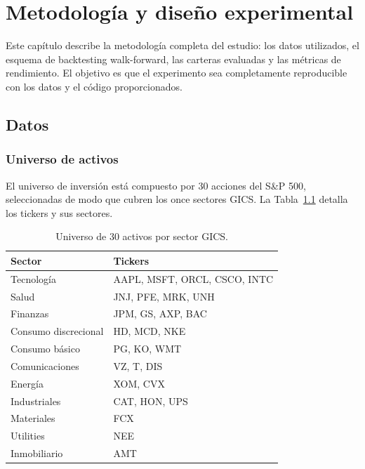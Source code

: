 \chapter{Metodología y diseño experimental}
\label{ch:metodologia}

Este capítulo describe la metodología completa del estudio: los datos
utilizados, el esquema de backtesting walk-forward, las carteras evaluadas
y las métricas de rendimiento. El objetivo es que el experimento sea
completamente reproducible con los datos y el código proporcionados.

\section{Datos}

\subsection{Universo de activos}

El universo de inversión está compuesto por 30 acciones del S\&P 500,
seleccionadas de modo que cubren los once sectores GICS. La
Tabla~\ref{tab:universo} detalla los tickers y sus sectores.

\begin{table}[htbp]
    \centering
    \caption{Universo de 30 activos por sector GICS.}
    \label{tab:universo}
    \begin{tabular}{ll}
        \toprule
        \textbf{Sector} & \textbf{Tickers} \\
        \midrule
        Tecnología & AAPL, MSFT, ORCL, CSCO, INTC \\
        Salud & JNJ, PFE, MRK, UNH \\
        Finanzas & JPM, GS, AXP, BAC \\
        Consumo discrecional & HD, MCD, NKE \\
        Consumo básico & PG, KO, WMT \\
        Comunicaciones & VZ, T, DIS \\
        Energía & XOM, CVX \\
        Industriales & CAT, HON, UPS \\
        Materiales & FCX \\
        Utilities & NEE \\
        Inmobiliario & AMT \\
        \bottomrule
    \end{tabular}
\end{table}

